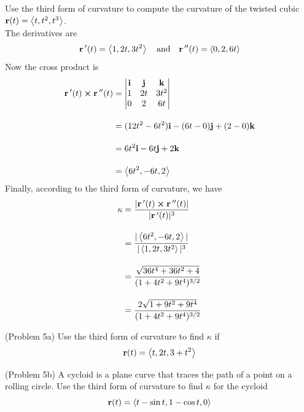 \documentclass[handout]{ximera}
\begin{document}
\begin{example}[Example 5]
Use the third form of curvature to compute the curvature of the twisted cubic $\mathbf r(t) = \left\langle t, t^2, t^3\right\rangle$.\\
The derivatives are
\[
\mathbf r\,'(t) = \left\langle 1, 2t, 3t^2\right\rangle \quad \text{and} \quad \mathbf r\,''(t) = \left\langle 0, 2, 6t\right\rangle
\]
Now the cross product is
 \begin{align*}
 \mathbf  r\,'(t) \boldsymbol\times \mathbf r\,''(t) &= 
 \begin{vmatrix}
\mathbf{i} & \mathbf{j} & \mathbf{k}\\
1 & 2t & 3t^2\\
0 & 2 & 6t
\end{vmatrix}\\[10pt]
&= (12t^2 - 6t^2) \mathbf{i} - (6t - 0) \mathbf{j} + (2-0) \mathbf{k}\\[10pt]
 &=6t^2 \mathbf{i} -6t \mathbf{j} + 2 \mathbf{k}\\[10pt]
 &=\left\langle 6t^2, - 6t, 2\right\rangle
 \end{align*}
Finally, according to the third form of curvature, we have
\begin{align*}
\kappa &=  \frac{|\mathbf r\,'(t) \boldsymbol\times \mathbf r\,''(t)|}{|\mathbf r\,'(t)|^3}\\[10pt]
       &=  \frac{|\left\langle 6t^2,  -6t, 2\right\rangle|}{|\left\langle 1, 2t, 3t^2\right\rangle|^3}\\[10pt]
       &= \frac{\sqrt{36t^4 + 36t^2 + 4}}{(1 + 4t^2 + 9t^4)^{3/2}}\\[10pt]
       &= \frac{2\sqrt{1 + 9t^2 + 9t^4}}{(1 + 4t^2 + 9t^4)^{3/2}}
\end{align*}
\end{example}

\begin{problem}(Problem 5a)
Use the third form of curvature to find $\kappa$ if 
\[
\mathbf r(t) = \left\langle t, 2t, 3+t^2\right\rangle
\]

\begin{multipleChoice}
\end{multipleChoice}

\end{problem}

\begin{problem}(Problem 5b)
A cycloid is a plane curve that traces the path of a point on a rolling circle.
Use the third form of curvature to find $\kappa$ for the cycloid 
\[
\mathbf r(t) = \left\langle t - \sin t, 1 - \cos t, 0\right\rangle
\]

\begin{multipleChoice}
\end{multipleChoice}

\end{problem}
\end{document}
